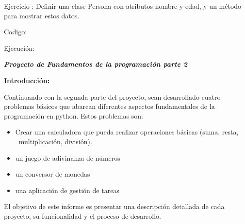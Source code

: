 \documentclass[a4paper]{article}
\newcommand\textstyleListLabelx[1]{\textrm{\textbf{#1}}}
\begin{document}
\pagestyle{Convertedvi}
{
Ejercicio : Definir una clase Persona con atributos nombre y edad, y un método para mostrar estos datos.}



\begin{center}
\end{center}

\bigskip

{
Codigo:}

{
Ejecución:}

\begin{center}
\end{center}
\clearpage

{\centering{}
\textbf{\textit{Proyecto de Fundamentos de la programación parte 2}}
\par}


\bigskip

{
\textbf{Introducción:}}


\bigskip

{
Continuando con la segunda parte del proyecto, sean desarrollado cuatro problemas básicos que abarcan diferentes
aspectos fundamentales de la programación en python. Estos problemas son: }

\begin{itemize}[series=listWWNumii,label=\textstyleListLabelx{{}-}]
\item {
Crear una calculadora que pueda realizar operaciones básicas (suma, resta, \ multiplicación, división).}
\item {
un juego de adivinanza de números }
\item {
un conversor de monedas \ }
\item {
una aplicación de gestión de tareas}
\end{itemize}
{
El objetivo de este informe es presentar una descripción detallada de cada proyecto, su funcionalidad y el proceso de
desarrollo.}


\bigskip
\end{document}
